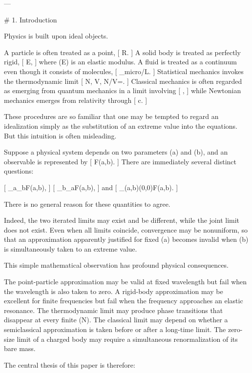 ---

# 1. Introduction

Physics is built upon ideal objects.

A particle is often treated as a point,
[
R.
]
A solid body is treated as perfectly rigid,
[
E\rightarrow\infty,
]
where (E) is an elastic modulus. A fluid is treated as a continuum even though it consists of molecules,
[
\ell_{\rm micro}/L.
]
Statistical mechanics invokes the thermodynamic limit
[
N\rightarrow\infty,
\qquad
V\rightarrow\infty,
\qquad
N/V=.
]
Classical mechanics is often regarded as emerging from quantum mechanics in a limit involving
[
\hbar{},
]
while Newtonian mechanics emerges from relativity through
[
c\rightarrow\infty.
]

These procedures are so familiar that one may be tempted to regard an idealization simply as the substitution of an extreme value into the equations. But this intuition is often misleading.

Suppose a physical system depends on two parameters (a) and (b), and an observable is represented by
[
F(a,b).
]
There are immediately several distinct questions:

[
\lim_{a}\lim_{b}F(a,b),
]
[
\lim_{b}\lim_{a}F(a,b),
]
and
[
\lim_{(a,b)\to(0,0)}F(a,b).
]

There is no general reason for these quantities to agree.

Indeed, the two iterated limits may exist and be different, while the joint limit does not exist. Even when all limits coincide, convergence may be nonuniform, so that an approximation apparently justified for fixed (a) becomes invalid when (b) is simultaneously taken to an extreme value.

This simple mathematical observation has profound physical consequences.

The point-particle approximation may be valid at fixed wavelength but fail when the wavelength is also taken to zero. A rigid-body approximation may be excellent for finite frequencies but fail when the frequency approaches an elastic resonance. The thermodynamic limit may produce phase transitions that disappear at every finite (N). The classical limit may depend on whether a semiclassical approximation is taken before or after a long-time limit. The zero-size limit of a charged body may require a simultaneous renormalization of its bare mass.

The central thesis of this paper is therefore:

